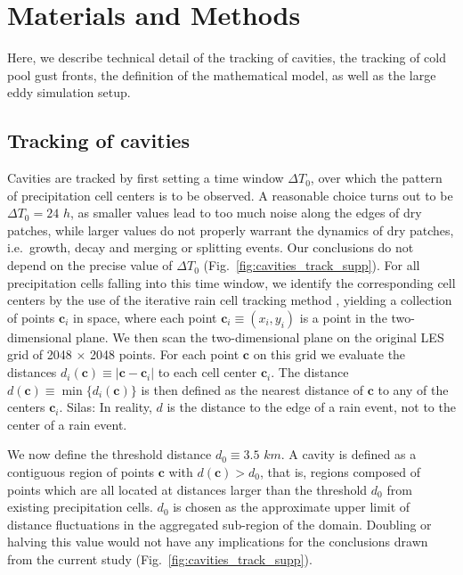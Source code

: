 \documentclass[reprint,amsmath,amssymb]{revtex4-1}
\begin{document}
\section{Materials and Methods}
Here, we describe technical detail of the tracking of cavities, the tracking of cold pool gust fronts, the definition of the mathematical model, as well as the large eddy simulation setup.

\subsection{Tracking of cavities}\label{sec:cavity_tracking}
Cavities are tracked by first setting a time window $\Delta T_0$, over which the pattern of precipitation cell centers is to be observed.
A reasonable choice turns out to be $\Delta T_0=24$ $h$, as smaller values lead to too much noise along the edges of dry patches, while larger values do not properly warrant the dynamics of dry patches, i.e.~growth, decay and merging or splitting events.
Our conclusions do not depend on the precise value of $\Delta T_0$ (Fig.~\ref{fig:cavities_track_supp}).
For all precipitation cells falling into this time window, we identify the corresponding cell centers by the use of the iterative rain cell tracking method \cite{moseley2014}, yielding a collection of points $\mathbf{c}_i$ in space, where each point $\mathbf{c}_i \equiv (x_i, y_i)$ is a point in the two-dimensional plane.
We then scan the two-dimensional plane on the original LES grid of 2048 $\times$ 2048 points. 
For each point $\mathbf{c}$ on this grid we evaluate the distances $d_i(\mathbf{c})\equiv|\mathbf{c}-\mathbf{c}_i|$ to each cell center $\mathbf{c}_i$.
The distance $d(\mathbf{c})\equiv \min{\{d_i(\mathbf{c})\}}$ is then defined as the nearest distance of $\mathbf{c}$ to any of the centers $\mathbf{c}_i$. {\color{red} Silas: In reality, $d$ is the distance to the edge of a rain event, not to the center of a rain event.}

We now define the threshold distance $d_0\equiv 3.5$ $km$.
A cavity is defined as a contiguous region of points $\mathbf{c}$ with $d(\mathbf{c})>d_0$, that is, regions composed of points which are all located at distances larger than the threshold $d_0$ from existing precipitation cells.
$d_0$ is chosen as the approximate upper limit of distance fluctuations in the aggregated sub-region of the domain.
Doubling or halving this value would not have any implications for the conclusions drawn from the current study (Fig.~\ref{fig:cavities_track_supp}).
\end{document}
